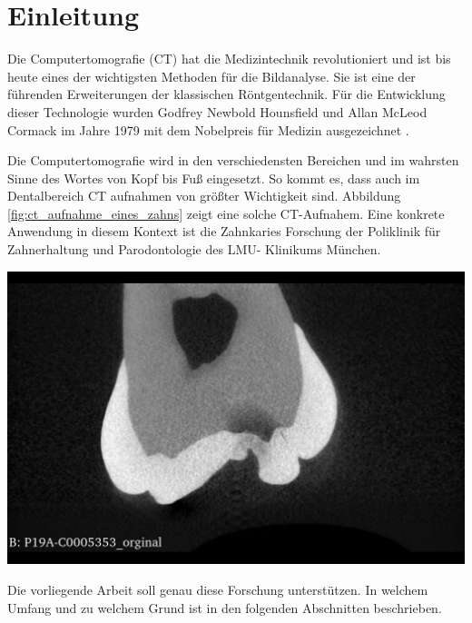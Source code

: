 \chapter{Einleitung}
\label{chap:einleitung} Die Computertomografie (CT) hat die Medizintechnik revolutioniert
und ist bis heute eines der wichtigsten Methoden für die Bildanalyse. Sie ist
eine der führenden Erweiterungen der klassischen Röntgentechnik. Für die Entwicklung
dieser Technologie wurden Godfrey Newbold Hounsfield und Allan McLeod Cormack im
Jahre 1979 mit dem Nobelpreis für Medizin ausgezeichnet \citep[Seite12]{handels2000}.

\begin{minipage}{0.40\textwidth}
	Die Computertomografie wird in den verschiedensten Bereichen und im wahrsten Sinne
	des Wortes von Kopf bis Fuß eingesetzt. So kommt es, dass auch im Dentalbereich
	CT aufnahmen von größter Wichtigkeit sind. Abbildung
	\ref{fig:ct_aufnahme_eines_zahns} zeigt eine solche CT-Aufnahem. Eine konkrete
	Anwendung in diesem Kontext ist die Zahnkaries Forschung der Poliklinik für Zahnerhaltung
	und Parodontologie des LMU- Klinikums München.
\end{minipage}
\hfill
\begin{minipage}{0.50\textwidth}
	\centering
	\includegraphics[scale=0.2, width=\textwidth]{img/micro_ct_orginal.jpg}
	 \label{fig:ct_aufnahme_eines_zahns}
\end{minipage}

Die vorliegende Arbeit soll genau diese Forschung unterstützen. In welchem Umfang
und zu welchem Grund ist in den folgenden Abschnitten beschrieben.

